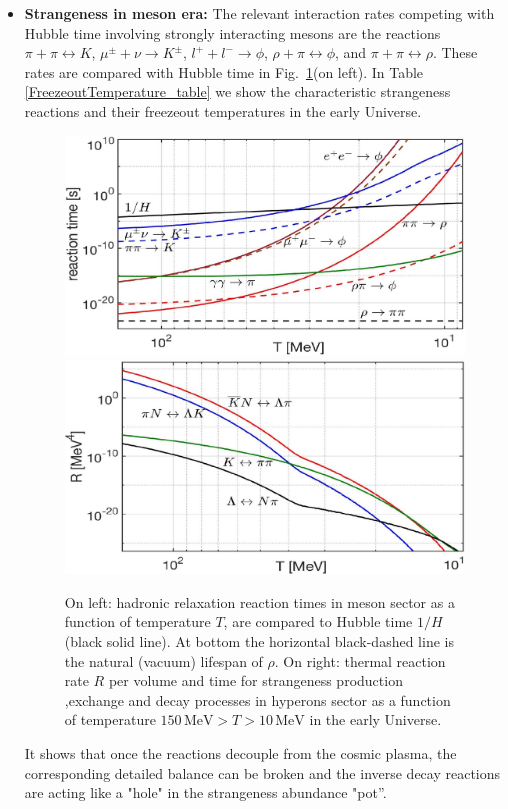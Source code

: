 \documentclass[universe,article,submit,moreauthors,pdftex,a4paper]{Definitions/mdpi}
\begin{document}
\begin{itemize}
\item \textbf{Strangeness in meson era:}
The relevant interaction rates competing with Hubble time involving strongly interacting mesons are the reactions $\pi+\pi\leftrightarrow K$, $\mu^\pm+\nu\rightarrow K^\pm$, $l^++l^-\rightarrow\phi$, $\rho+\pi\leftrightarrow\phi$, and $\pi+\pi\leftrightarrow\rho$. 
 These rates are compared with Hubble time in Fig.~\ref{reaction_time_tot}(on left). In Table\,\ref{FreezeoutTemperature_table} we show the characteristic strangeness reactions and their freezeout temperatures in the early Universe. 

\begin{figure}[ht]
\centering
\includegraphics[width=0.49\linewidth]{Strangeness_Hubble_C.jpg}
\includegraphics[width=0.49\linewidth]{NewHyperonRate_C.jpg}
\caption{On left: hadronic relaxation reaction times in meson sector as a function of temperature $T$, are compared to Hubble time $1/H$ (black solid line). At bottom the horizontal black-dashed line is the natural (vacuum) lifespan of $\rho$. On right: thermal reaction rate $R$ per volume and time for strangeness production ,exchange and decay processes in hyperons sector as a function of temperature $150\,\mathrm{MeV}> T>10\,\mathrm{MeV}$ in the early Universe.}
\label{reaction_time_tot}
\end{figure}
It shows that once the reactions decouple from the cosmic plasma, the corresponding detailed balance can be broken and the inverse decay reactions are acting like a "hole" in the strangeness abundance "pot”.

\end{itemize}
\end{document}
